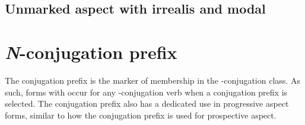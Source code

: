 \documentclass[12pt,letterpaper,landscape,oneside,article]{memoir}
\begin{document}
\subsection{Unmarked aspect with irrealis and modal}

\clearpage
\section{\textit{N}-conjugation prefix}

The  conjugation prefix is the marker of membership in the -conjugation class.
As such, forms with  occur for any -conjugation verb when a conjugation prefix is selected.
The  conjugation prefix also has a dedicated use in progressive aspect forms, similar to how the  conjugation prefix is used for prospective aspect.
\end{document}
